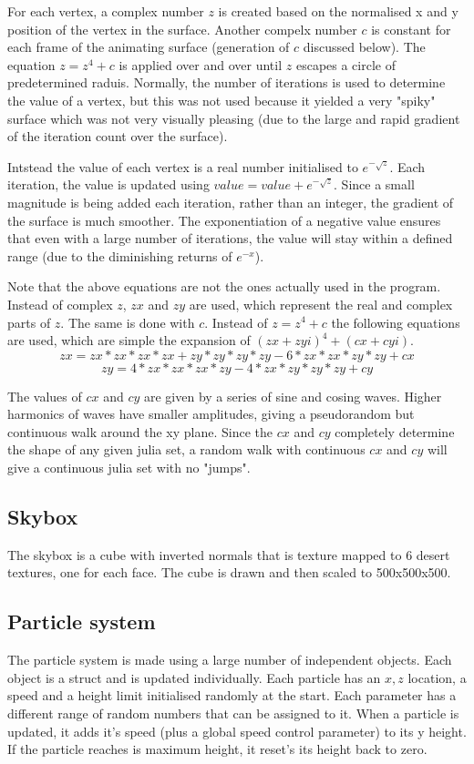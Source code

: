 \documentclass[10pt]{article}
\begin{document}
    For each vertex, a complex number $z$ is created based on the normalised x and y position of the vertex in the surface. Another compelx number $c$ is constant for each frame of the animating surface (generation of $c$ discussed below). The equation $z = z^4 + c$ is applied over and over until $z$ escapes a circle of predetermined raduis. Normally, the number of iterations is used to determine the value of a vertex, but this was not used because it yielded a very "spiky" surface which was not very visually pleasing (due to the large and rapid gradient of the iteration count over the surface).

    Intstead the value of each vertex is a real number initialised to $e^{-\sqrt{z}}$. Each iteration, the value is updated using $value = value + e^{-\sqrt{z}}$. Since a small magnitude is being added each iteration, rather than an integer, the gradient of the surface is much smoother. The exponentiation of a negative value ensures that even with a large number of iterations, the value will stay within a defined range (due to the diminishing returns of $e^{-x}$).

    Note that the above equations are not the ones actually used in the program. Instead of complex $z$, $zx$ and $zy$ are used, which represent the real and complex parts of $z$. The same is done with $c$. Instead of $z = z^4+c$ the following equations are used, which are simple the expansion of $(zx+zy i)^4+(cx+cy i)$.
    $$zx = zx * zx * zx * zx + zy * zy * zy * zy - 6 * zx * zx * zy * zy + cx$$
    $$zy = 4 * zx * zx * zx * zy - 4 * zx * zy * zy * zy + cy$$

    The values of $cx$ and $cy$ are given by a series of sine and cosing waves. Higher harmonics of waves have smaller amplitudes, giving a pseudorandom but continuous walk around the xy plane. Since the $cx$ and $cy$ completely determine the shape of any given julia set, a random walk with continuous $cx$ and $cy$ will give a continuous julia set with no "jumps".
    \subsection{Skybox}
    The skybox is a cube with inverted normals that is texture mapped to 6 desert textures, one for each face. The cube is drawn and then scaled to 500x500x500.
    \subsection{Particle system}
    The particle system is made using a large number of independent objects. Each object is a struct and is updated individually. Each particle has an $x, z$ location, a speed and a height limit initialised randomly at the start. Each parameter has a different range of random numbers that can be assigned to it. When a particle is updated, it adds it's speed (plus a global speed control parameter) to its y height. If the particle reaches is maximum height, it reset's its height back to zero.
\end{document}
